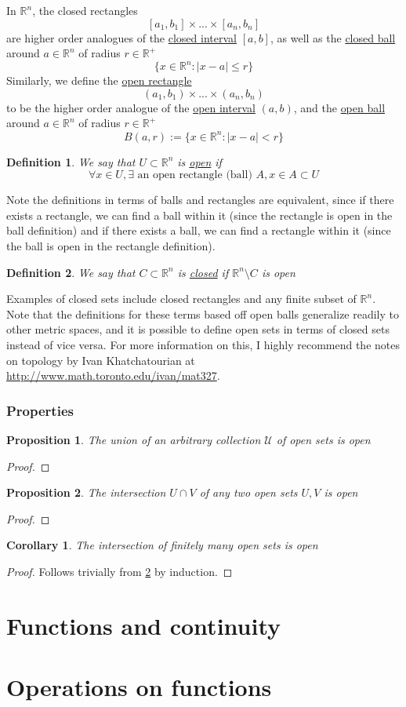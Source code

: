 \documentclass{article}
\newtheorem{definition}{Definition}
\newtheorem{proposition}{Proposition}
\newtheorem*{corollary}{Corollary}
\newcommand{\reals}[0]{\mathbb{R}}
\newcommand{\mc}[1]{\mathcal{#1}}
\newcommand{\defeq}[0]{:=}
\begin{document}
In \(\reals^n\), the closed rectangles
\[[a_1, b_1] \times ... \times [a_n, b_n]\]
are higher order analogues of the \underline{closed interval} \([a, b]\), as well as the \underline{closed ball} around \(a \in \reals^n\) of radius \(r \in \reals^+\)
\[\{x \in \reals^n : |x - a| \leq r\}\]
Similarly, we define the \underline{open rectangle}
\[(a_1, b_1) \times ... \times (a_n, b_n)\]
to be the higher order analogue of the \underline{open interval} \((a, b)\), and the \underline{open ball} around \(a \in \reals^n\) of radius \(r \in \reals^+\)
\[B(a, r) \defeq \{x \in \reals^n : |x - a| < r\}\]
\begin{definition}
  We say that \(U \subset \reals^n\) is \underline{open} if
  \[\forall x \in U, \exists \text{ an open rectangle (ball) } A, x \in A \subset U\]
\end{definition}
Note the definitions in terms of balls and rectangles are equivalent, since if there exists a rectangle, we can find a ball within it (since the rectangle is open in the ball definition) and if there exists a ball, we can find a rectangle within it (since the ball is open in the rectangle definition).
\begin{definition}
  We say that \(C \subset \reals^n\) is \underline{closed} if \(\reals^n \setminus C\) is open
\end{definition}
Examples of closed sets include closed rectangles and any finite subset of \(\reals^n\). Note that the definitions for these terms based off open balls generalize readily to other metric spaces, and it is possible to define open sets in terms of closed sets instead of vice versa. For more information on this, I highly recommend the notes on topology by Ivan Khatchatourian at \url{http://www.math.toronto.edu/ivan/mat327}.

\subsubsection{Properties}

\begin{proposition}
 The union of an arbitrary collection \(\mc{U}\) of open sets is open
\end{proposition}
\begin{proof}
\end{proof}

\begin{proposition}
  The intersection \(U \cap V\) of any two open sets \(U, V\) is open
  \label{interopen}
\end{proposition}
\begin{proof}
\end{proof}
\begin{corollary}
  The intersection of finitely many open sets is open
\end{corollary}
\begin{proof}
  Follows trivially from \ref{interopen} by induction.
\end{proof}

\section{Functions and continuity}

\section{Operations on functions}
\end{document}
